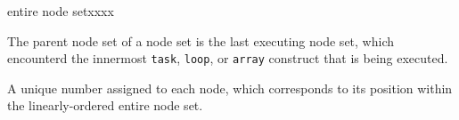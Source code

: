 \begin{namelist}{entire node setxxxx}

 The parent node set of a node set is the last executing node set, which
 encounterd the innermost {\tt task}, {\tt loop}, or {\tt array}
 construct that is being executed.


 A unique number assigned to each node, which corresponds to its
 position within the linearly-ordered entire node set.

%

%
%
%
%
%

\end{namelist}


